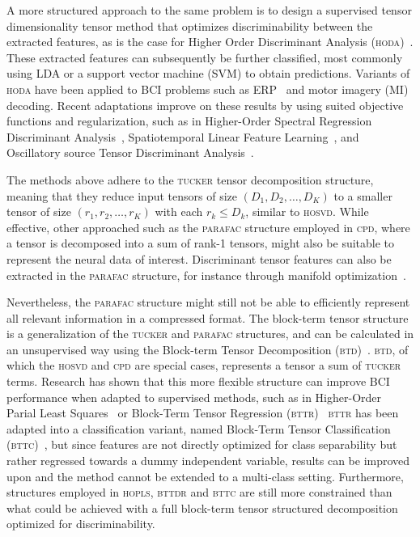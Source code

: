 \documentclass[twocolumn]{article}
\begin{document}
A more structured approach to the same problem is to design a supervised
tensor dimensionality tensor method that optimizes discriminability between the
extracted features, as is the case for Higher Order Discriminant
Analysis (\textsc{hoda})~\cite{Yan2005,Phan2010,Froelich2018}.
These extracted features can subsequently be further classified, most commonly
using LDA or a support vector machine (SVM) to obtain predictions.
Variants of \textsc{hoda} have been applied to BCI problems such as
ERP~\cite{Onishi2012,Higashi2016} and motor imagery (MI)~\cite{Liu2015,Cai2021}
decoding.
Recent adaptations improve on these results by using suited objective
functions and regularization, such as in Higher-Order Spectral Regression
Discriminant Analysis~\cite{Jamshidi2017}, Spatiotemporal Linear
Feature Learning~\cite{Aghili2023}, and Oscillatory source Tensor Discriminant
Analysis~\cite{Jorajuria2022}.

The methods above adhere to the \textsc{tucker} tensor decomposition
structure, meaning that they reduce input tensors of size
$(D_1,D_2,\ldots,D_K)$ to a smaller tensor of size $(r_1,r_2,\ldots,r_K)$ with
each $r_k\leq D_k$, similar to \textsc{hosvd}.
While effective, other approached such as the \textsc{parafac} structure employed in
\textsc{cpd}, where a tensor is decomposed into a sum of rank-1 tensors,
might also be suitable to represent the neural data of interest.
Discriminant tensor features can also be extracted
in the \textsc{parafac} structure, for instance through manifold
optimization~\cite{Froelich2018}.

Nevertheless, the \textsc{parafac} structure might still not be able to
efficiently represent all relevant information in a compressed format.
The block-term tensor structure is a generalization of the \textsc{tucker} and
\textsc{parafac} structures, and can be calculated in an unsupervised way using
the Block-term Tensor Decomposition
(\textsc{btd})~\cite{DeLathauwer2008,DeLathauwer2008a,DeLathauwer2008b,Rontogiannis2021}.
\textsc{btd}, of which the \textsc{hosvd} and \textsc{cpd} are special cases,
represents a tensor a sum of \textsc{tucker} terms.
Research has shown that this more flexible structure can improve BCI performance
when adapted to supervised methods, such as in Higher-Order Parial Least
Squares~\cite{Camarrone2018} or Block-Term Tensor Regression (\textsc{bttr})~\cite{Faes2022,Faes2022b}
\textsc{bttr} has been adapted into a classification variant, named Block-Term
Tensor Classification (\textsc{bttc})~\cite{Camarrone2021}, but since features
are not directly optimized for class separability but rather regressed towards
a dummy independent variable, results can be improved upon and the method
cannot be extended to a multi-class setting.
Furthermore, structures employed in \textsc{hopls}, \textsc{bttdr} and
\textsc{bttc} are still more constrained than what could be achieved with a
full block-term tensor structured decomposition optimized for discriminability.
\end{document}
